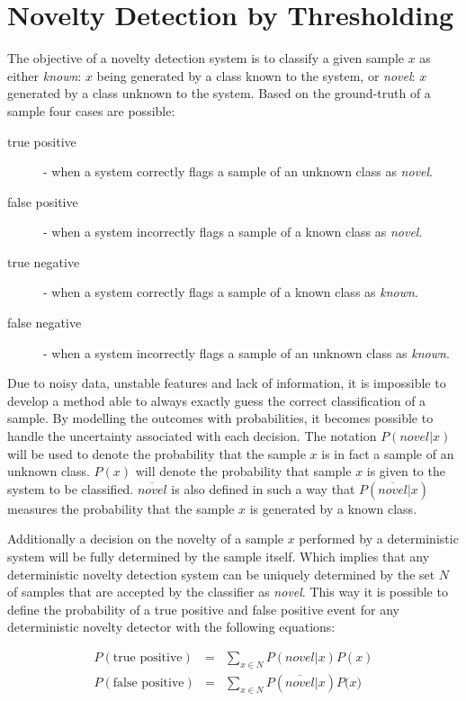 \section{Novelty Detection by Thresholding}
\label{sec:threshold}
The objective of a novelty detection system is to classify a given sample $x$ as
either \emph{known}: $x$ being generated by a class known to the system, or \emph{novel}:
$x$ generated by a class unknown to the system. Based on the ground\hyp{}truth of a sample four cases are possible:

\begin{description}
\item[true positive]  - when a system correctly   flags a sample of an unknown class as \emph{novel}.
\item[false positive] - when a system incorrectly flags a sample of a known class as \emph{novel}.
\item[true negative]  - when a system correctly   flags a sample of a known class as \emph{known}.
\item[false negative] - when a system incorrectly flags a sample of an unknown class as \emph{known}.
\end{description}

Due to noisy data, unstable features and lack of information, it is impossible to develop
a method able to always exactly guess the correct classification of a sample.
By modelling the outcomes with probabilities, it becomes possible to handle the uncertainty
associated with each decision.
The notation $P(novel|x)$ will be used to denote the probability that the sample $x$ is in fact a
sample of an unknown class. $P(x)$ will denote the probability that sample $x$ is given to the
system to be classified. $\overline{novel}$ is also defined in such a way that
$P(\overline{novel}|x)$ measures the probability that the sample $x$ is generated by a known class.

Additionally a decision on the novelty of a sample $x$ performed by a deterministic system
will be fully determined by the sample itself.
Which implies that any deterministic novelty detection system can be uniquely determined by the set $N$
of samples that are accepted by the classifier as \emph{novel}.
This way it is possible to define the probability of a true positive and false positive event for any
deterministic novelty detector with the following equations:

\begin{eqnarray}
P(\text{true positive})  &=& \sum_{x \in N}{P(novel|x)P(x)} \\
P(\text{false positive}) &=& \sum_{x \in N}{P(\overline{novel}|x)P(x})
\end{eqnarray}

